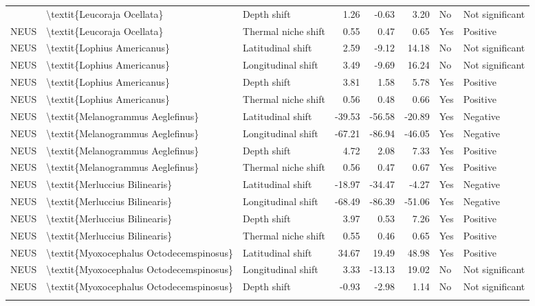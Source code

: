 \begin{longtable}[t]{lllrrrll}
{{NEUS & \textbackslash{}textit\{Leucoraja Ocellata\} & Depth shift & 1.26 & -0.63 & 3.20 & No & Not significant\\
NEUS & \textbackslash{}textit\{Leucoraja Ocellata\} & Thermal niche shift & 0.55 & 0.47 & 0.65 & Yes & Positive\\
\addlinespace
NEUS & \textbackslash{}textit\{Lophius Americanus\} & Latitudinal shift & 2.59 & -9.12 & 14.18 & No & Not significant\\
NEUS & \textbackslash{}textit\{Lophius Americanus\} & Longitudinal shift & 3.49 & -9.69 & 16.24 & No & Not significant\\
NEUS & \textbackslash{}textit\{Lophius Americanus\} & Depth shift & 3.81 & 1.58 & 5.78 & Yes & Positive\\
NEUS & \textbackslash{}textit\{Lophius Americanus\} & Thermal niche shift & 0.56 & 0.48 & 0.66 & Yes & Positive\\
NEUS & \textbackslash{}textit\{Melanogrammus Aeglefinus\} & Latitudinal shift & -39.53 & -56.58 & -20.89 & Yes & Negative\\
\addlinespace
NEUS & \textbackslash{}textit\{Melanogrammus Aeglefinus\} & Longitudinal shift & -67.21 & -86.94 & -46.05 & Yes & Negative\\
NEUS & \textbackslash{}textit\{Melanogrammus Aeglefinus\} & Depth shift & 4.72 & 2.08 & 7.33 & Yes & Positive\\
NEUS & \textbackslash{}textit\{Melanogrammus Aeglefinus\} & Thermal niche shift & 0.56 & 0.47 & 0.67 & Yes & Positive\\
NEUS & \textbackslash{}textit\{Merluccius Bilinearis\} & Latitudinal shift & -18.97 & -34.47 & -4.27 & Yes & Negative\\
NEUS & \textbackslash{}textit\{Merluccius Bilinearis\} & Longitudinal shift & -68.49 & -86.39 & -51.06 & Yes & Negative\\
\addlinespace
NEUS & \textbackslash{}textit\{Merluccius Bilinearis\} & Depth shift & 3.97 & 0.53 & 7.26 & Yes & Positive\\
NEUS & \textbackslash{}textit\{Merluccius Bilinearis\} & Thermal niche shift & 0.55 & 0.46 & 0.65 & Yes & Positive\\
NEUS & \textbackslash{}textit\{Myoxocephalus Octodecemspinosus\} & Latitudinal shift & 34.67 & 19.49 & 48.98 & Yes & Positive\\
NEUS & \textbackslash{}textit\{Myoxocephalus Octodecemspinosus\} & Longitudinal shift & 3.33 & -13.13 & 19.02 & No & Not significant\\
NEUS & \textbackslash{}textit\{Myoxocephalus Octodecemspinosus\} & Depth shift & -0.93 & -2.98 & 1.14 & No & Not significant\\
}}
\end{longtable}
